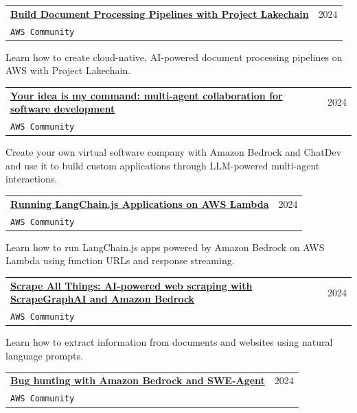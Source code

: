\documentclass[letterpaper,11pt]{article}
\makeatletter
\newcommand{\resumeSubheading}[4]{
  \vspace{-2pt}\item
    \begin{tabular*}{0.97\textwidth}[t]{l@{\extracolsep{\fill}}r}
      \textbf{#1} & #2 \\
      \texttt{\small#3} & \textit{\small #4} \\
    \end{tabular*}\vspace{-7pt}
}
\makeatother
\begin{document}
    \vspace{2mm}
    \resumeSubheading
      {\href{https://community.aws/content/2hXqq9IE65WzyrfvqM57Za0lEgF/build-document-processing-pipelines-with-project-lakechain}{Build Document Processing Pipelines with Project Lakechain}}{2024}
      {AWS Community}{}
    \vspace{3mm}

    Learn how to create cloud-native, AI-powered document processing pipelines on AWS with Project Lakechain.
    
    \vspace{2mm}
    \resumeSubheading
      {\href{https://community.aws/content/2gYNfgF0VRkzU9tDmg23vCEC2BH/your-idea-is-my-command-multi-agent-collaboration-for-software-development}{Your idea is my command: multi-agent collaboration for software development}}{2024}
      {AWS Community}{}
    \vspace{3mm}

    Create your own virtual software company with Amazon Bedrock and ChatDev and use it to build custom applications through LLM-powered multi-agent interactions.
   
    \vspace{2mm}
    \resumeSubheading
      {\href{https://community.aws/content/2grhh3vrinYLsg3xkFNCe4LCcUL/running-langchain-js-applications-on-aws-lambda}{Running LangChain.js Applications on AWS Lambda}}{2024}
      {AWS Community}{}
    \vspace{3mm}

    Learn how to run LangChain.js apps powered by Amazon Bedrock on AWS Lambda using function URLs and response streaming.
    
    \vspace{2mm}
    \resumeSubheading
      {\href{https://community.aws/content/2gjRWwp4Eb51SXt6FRZNxVh71R7/scrape-all-things-ai-powered-web-scraping-with-scrapegraphai-and-amazon-bedrock}{Scrape All Things: AI-powered web scraping with ScrapeGraphAI and Amazon Bedrock}}{2024}
      {AWS Community}{}
    \vspace{3mm}

    Learn how to extract information from documents and websites using natural language prompts.
    
    \vspace{2mm}
    \resumeSubheading
      {\href{https://community.aws/content/2g5J4RT6lli2jetVcHezTRpKZFu/bug-hunting-with-amazon-bedrock-and-swe-agent}{Bug hunting with Amazon Bedrock and SWE-Agent}}{2024}
      {AWS Community}{}
    \vspace{3mm}
\end{document}
